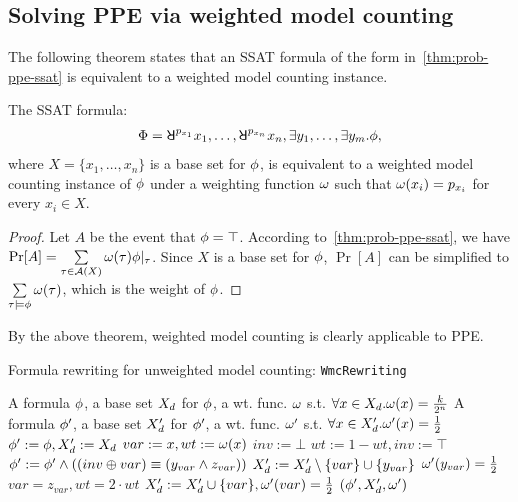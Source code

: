 \subsection{Solving PPE via weighted model counting}
The following theorem states that an SSAT formula of the form
in~\cref{thm:prob-ppe-ssat} is equivalent to a weighted model counting instance.
\begin{theorem}
    The SSAT formula:
    \begin{align*}
        \Qf=
        \random{p_{x_1}}x_1,\ldots,\random{p_{x_n}}x_n,
        \exists y_1,\ldots,\exists y_m.\pf,
    \end{align*}
    where $X=\{x_1,\ldots,x_n\}$ is a base set for $\phi$,
    is equivalent to a weighted model counting instance of $\phi$
    under a weighting function $\omega$ such that
    $\omega(x_i)=p_{x_i}$ for every $x_i\in X$.
\end{theorem}
\begin{proof}
    Let $A$ be the event that $\phi=\top$.
    According to~\cref{thm:prob-ppe-ssat},
    we have $\Pr[A]=\sum\limits_{\tau\in\mathcal{A}(X)}\omega(\tau)\phi|_{\tau}$.
    Since $X$ is a base set for $\phi$,
    $\Pr[A]$ can be simplified to $\sum\limits_{\tau\models\phi}\omega(\tau)$,
    which is the weight of $\phi$.
\end{proof}
By the above theorem, weighted model counting is clearly applicable to PPE.

\begin{algorithm}[p]
    \caption{Formula rewriting for unweighted model counting: \texttt{WmcRewriting}}
    \label{alg:wmcrewriting}
    \begin{algorithmic}[1]
        \REQUIRE A formula $\phi$, a base set $X_d$ for $\phi$,
        a wt. func. $\omega$ s.t. $\forall x\in X_d.\omega(x)=\frac{k}{2^n}$
        \ENSURE A formula $\phi'$, a base set $X_d'$ for $\phi'$,
        a wt. func. $\omega'$ s.t. $\forall x\in X_d'.\omega'(x)=\frac{1}{2}$
        \STATE $\phi':=\phi,X_d':=X_d$
        \STATE $var:=x,wt:=\omega(x)$
        \STATE $inv:=\bot$
        \STATE $wt:=1-wt,inv:=\top$
        \ENDIF
        \STATE $\phi':=\phi'\land((inv \oplus var) \equiv (y_{var} \land z_{var}))$
        \STATE $X_d':=X_d'\setminus\{var\}\cup\{y_{var}\}$
        \STATE $\omega'(y_{var})=\frac{1}{2}$
        \STATE $var=z_{var},wt=2 \cdot wt$
        \ENDWHILE
        \STATE $X_d':=X_d'\cup\{var\},\omega'(var)=\frac{1}{2}$
        \ENDFOR
        \RETURN $(\phi',X_d',\omega')$
    \end{algorithmic}
\end{algorithm}

